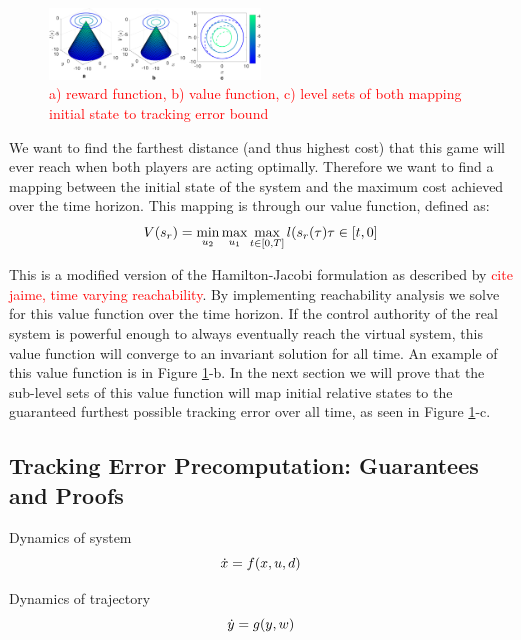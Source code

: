 \begin{figure}
	\centering
	\includegraphics[width=0.5\textwidth]{fig/quad4D_example}
	\caption{\textcolor{red}{a) reward function, b) value function, c) level sets of both mapping initial state to tracking error bound}}
	\label{fig:quad4D_example}
\end{figure} 
 
 We want to find the farthest distance (and thus highest cost) that this game will ever reach when both players are acting optimally. Therefore we want to find a mapping between the initial state of the system and the maximum cost achieved over the time horizon. This mapping is through our value function, defined as:
 \begin{equation}
 	V(s_r)= \min_{u_2} \max_{u_1} \max_{t\in [0,T]} l(s_r(\tau)
 	\tau \in [t, 0]
 \end{equation} 
 
 This is a modified version of the Hamilton-Jacobi formulation as described by \textcolor{red}{cite jaime, time varying reachability}. By implementing reachability analysis we solve for this value function over the time horizon. If the control authority of the real system is powerful enough to always eventually reach the virtual system, this value function will converge to an invariant solution for all time.  An example of this value function is in Figure \ref{fig:quad4D_example}-b. In the next section we will prove that the sub-level sets of this value function will map initial relative states to the guaranteed furthest possible tracking error over all time, as seen in Figure \ref{fig:quad4D_example}-c.
 
 \subsection{Tracking Error Precomputation: Guarantees and Proofs}
 Dynamics of system
 \begin{equation}
 \dot{x} = f(x, u, d)
 \end{equation}
 
 Dynamics of trajectory
 \begin{equation}
 \dot{y} = g(y, w)
 \end{equation}
 
